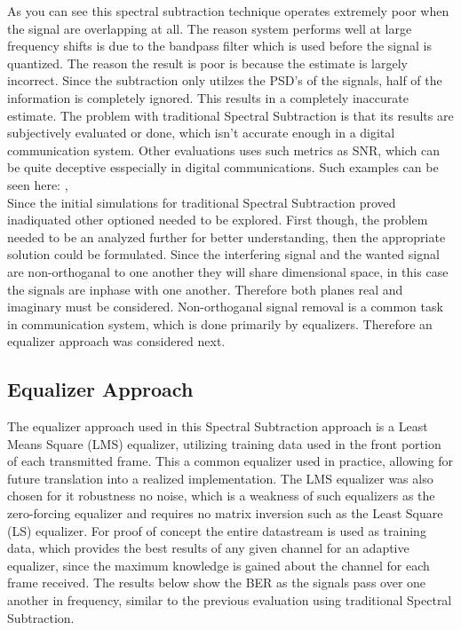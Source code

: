 As you can see this spectral subtraction technique operates extremely poor when the signal are overlapping at all.  The reason system performs well at large frequency shifts is due to the bandpass filter which is used before the signal is quantized.  The reason the result is poor is because the estimate is largely incorrect.  Since the subtraction only utilzes the PSD's of the signals, half of the information is completely ignored.  This results in a completely inaccurate estimate.  The problem with traditional Spectral Subtraction is that its results are subjectively evaluated or done, which isn't accurate enough in a digital communication system.  Other evaluations uses such metrics as SNR, which can be quite deceptive esspecially in digital communications.  Such examples can be seen here: \cite{ss_subjective1}, \cite{ss_subjective2} \\

Since the initial simulations for traditional Spectral Subtraction proved inadiquated other optioned needed to be explored.  First though, the problem needed to be an analyzed further for better understanding, then the appropriate solution could be formulated.  Since the interfering signal and the wanted signal are non-orthoganal to one another they will share dimensional space, in this case the signals are inphase with one another.  Therefore both planes real and imaginary must be considered.  Non-orthoganal signal removal is a common task in communication system, which is done primarily by equalizers.  Therefore an equalizer approach was considered next.\\

\subsection{Equalizer Approach}

The equalizer approach used in this Spectral Subtraction approach is a Least Means Square (LMS) equalizer, utilizing training data used in the front portion of each transmitted frame.  This a common equalizer used in practice, allowing for future translation into a realized implementation.  The LMS equalizer was also chosen for it robustness no noise, which is a weakness of such equalizers as the zero-forcing equalizer and requires no matrix inversion such as the Least Square (LS) equalizer.  For proof of concept the entire datastream is used as training data, which provides the best results of any given channel for an adaptive equalizer, since the maximum knowledge is gained about the channel for each frame received.  The results below show the BER as the signals pass over one another in frequency, similar to the previous evaluation using traditional Spectral Subtraction.\\
  

